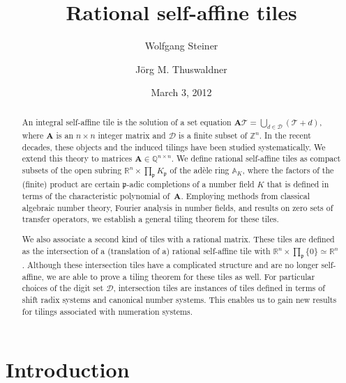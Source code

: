 \documentclass[12pt]{amsart}
\title{Rational self-affine tiles}
\author[W.~Steiner]{Wolfgang Steiner}
\author[J. M. Thuswaldner]{J\"org M. Thuswaldner}
\date{March 3, 2012}
\theoremstyle{definition}
\theoremstyle{remark}
\numberwithin{equation}{section}
\begin{document}
\begin{abstract}
An integral self-affine tile is the solution of a set equation $\mathbf{A} \mathcal{T} = \bigcup_{d \in \mathcal{D}} (\mathcal{T} + d)$, where $\mathbf{A}$ is an $n \times n$ integer matrix and $\mathcal{D}$ is a finite subset of $\mathbb{Z}^n$.
In the recent decades, these objects and the induced tilings have been studied systematically.
We extend this theory to matrices $\mathbf{A} \in \mathbb{Q}^{n \times n}$.
We define rational self-affine tiles as compact subsets of the open subring $\mathbb{R}^n\times \prod_\mathfrak{p} K_\mathfrak{p}$ of the ad\`ele ring $\mathbb{A}_K$, where the factors of the (finite) product are certain $\mathfrak{p}$-adic completions of a number field $K$ that is defined in terms of the characteristic polynomial of~$\mathbf{A}$.
Employing methods from classical algebraic number theory, Fourier analysis in number fields, and results on zero sets of transfer operators, we establish a general tiling theorem for these tiles.

We also associate a second kind of tiles with a rational matrix.
These tiles are defined as the intersection of a (translation of a) rational self-affine tile with $\mathbb{R}^n \times \prod_\mathfrak{p} \{0\} \simeq \mathbb{R}^n$.
Although these intersection tiles have a complicated structure and are no longer self-affine, we are able to prove a tiling theorem for these tiles as well.
For particular choices of the digit set $\mathcal{D}$, intersection tiles are instances of tiles defined in terms of shift radix systems and canonical number systems.
This enables us to gain new results for tilings associated with numeration systems.
\end{abstract}

\maketitle

\section{Introduction}
\end{document}
